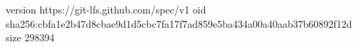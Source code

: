 version https://git-lfs.github.com/spec/v1
oid sha256:cbfa1e2b47d8cbae9d1d5cbc7fa17f7ad859e5ba434a00a40aab37b60892f12d
size 298394
